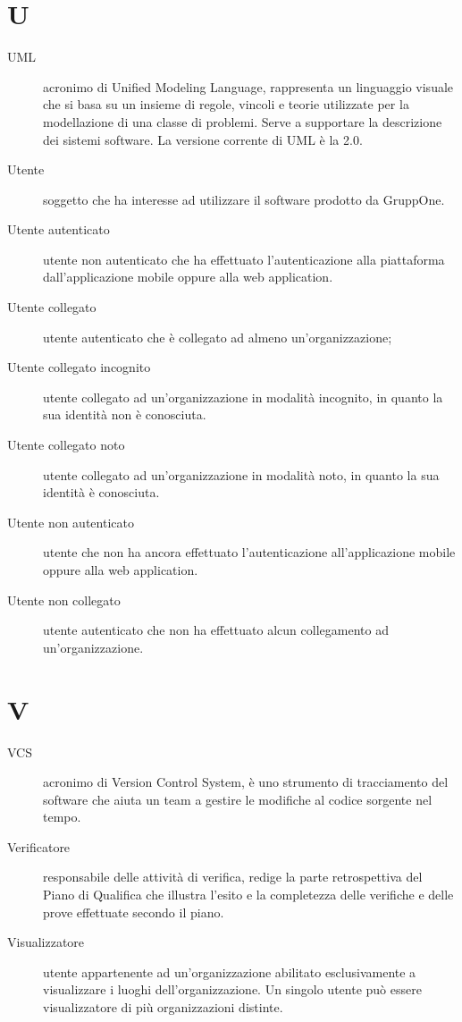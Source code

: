 \documentclass{article}
\begin{document}
\section{U}
\begin{description}
  \item[UML] acronimo di Unified Modeling Language, rappresenta un linguaggio visuale che si basa su un insieme di regole, vincoli e teorie utilizzate per la modellazione di una classe di problemi. Serve a supportare la descrizione dei sistemi software. La versione corrente di UML è la 2.0.
  \item[Utente] soggetto che ha interesse ad utilizzare il software prodotto da GruppOne.
  \item[Utente autenticato] utente non autenticato che ha effettuato l'autenticazione alla piattaforma dall'applicazione mobile oppure alla web application.
  \item[Utente collegato] utente autenticato che è collegato ad almeno un'organizzazione;
  \item[Utente collegato incognito] utente collegato ad un'organizzazione in modalità incognito, in quanto la sua identità non è conosciuta.
  \item[Utente collegato noto] utente collegato ad un'organizzazione in modalità noto, in quanto la sua identità è conosciuta.
  \item[Utente non autenticato] utente che non ha ancora effettuato l'autenticazione all'applicazione mobile oppure alla web application.
  \item[Utente non collegato] utente autenticato che non ha effettuato alcun collegamento ad un'organizzazione.
\end{description}
\newpage
\section{V}
\begin{description}
  \item[VCS] acronimo di Version Control System, è uno strumento di tracciamento del software che aiuta un team a gestire le modifiche al codice sorgente nel tempo.
  \item[Verificatore] responsabile delle attività di verifica, redige la parte retrospettiva del Piano di Qualifica che illustra l'esito e la completezza delle verifiche e delle prove effettuate secondo il piano.
  \item[Visualizzatore] utente appartenente ad un'organizzazione abilitato esclusivamente a visualizzare i luoghi dell'organizzazione. Un singolo utente può essere visualizzatore di più organizzazioni distinte.
\end{description}
\newpage
\end{document}

